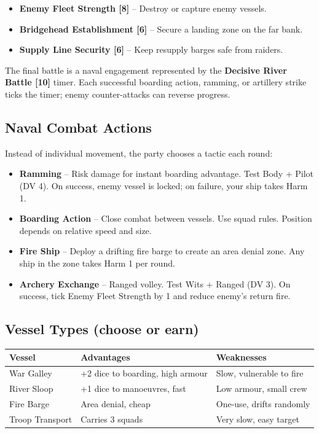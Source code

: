 \documentclass[11pt]{article}
\begin{document}
\begin{itemize}
\item \textbf{Enemy Fleet Strength [8]} -- Destroy or capture enemy vessels.
\item \textbf{Bridgehead Establishment [6]} -- Secure a landing zone on the far bank.
\item \textbf{Supply Line Security [6]} -- Keep resupply barges safe from raiders.
\end{itemize}

The final battle is a naval engagement represented by the \textbf{Decisive River Battle [10]} timer. Each successful boarding action, ramming, or artillery strike ticks the timer; enemy counter-attacks can reverse progress.

\subsection*{Naval Combat Actions}
Instead of individual movement, the party chooses a tactic each round:
\begin{itemize}
\item \textbf{Ramming} -- Risk damage for instant boarding advantage. Test Body + Pilot (DV 4). On success, enemy vessel is locked; on failure, your ship takes Harm 1.
\item \textbf{Boarding Action} -- Close combat between vessels. Use squad rules. Position depends on relative speed and size.
\item \textbf{Fire Ship} -- Deploy a drifting fire barge to create an area denial zone. Any ship in the zone takes Harm 1 per round.
\item \textbf{Archery Exchange} -- Ranged volley. Test Wits + Ranged (DV 3). On success, tick Enemy Fleet Strength by 1 and reduce enemy's return fire.
\end{itemize}

\subsection*{Vessel Types (choose or earn)}

\begin{tabular}{@{}lll@{}}
\toprule
\textbf{Vessel} & \textbf{Advantages} & \textbf{Weaknesses}\\
\midrule
War Galley & +2 dice to boarding, high armour & Slow, vulnerable to fire\\
River Sloop & +1 dice to manoeuvres, fast & Low armour, small crew\\
Fire Barge & Area denial, cheap & One-use, drifts randomly\\
Troop Transport & Carries 3 squads & Very slow, easy target\\
\bottomrule
\end{tabular}
\end{document}
